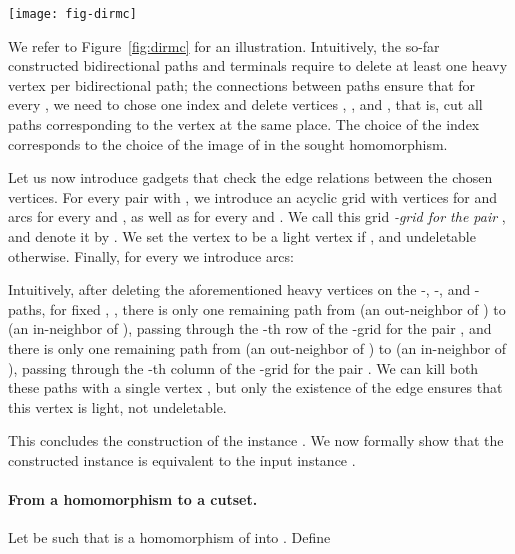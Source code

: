 \begin{figure*}[tb]
\begin{center}
\texttt{[image: fig-dirmc]}
\caption{Illustration of the reduction for \dirmc{}. Black vertices are light, gray are heavy, and white are undeletable.
The top figure illustates a -grid, together with an intended solution marked by red circles.
Here, the vertex  lies in the top-left corner of the grid, the first coordinate describes the row of the grid,
and the second one the column.
The bottom figure illustrates an -, -, and -path for a pair  with  and .}
\label{fig:dirmc}
\end{center}
\end{figure*}

We refer to Figure~\ref{fig:dirmc} for an illustration.
Intuitively, the so-far constructed bidirectional paths and terminals require to delete at least one heavy vertex per 
bidirectional path; the connections between paths ensure that for every , we need to chose
one index  and delete vertices , , and , that is, cut all paths corresponding to the vertex  at the same place. The choice of the index  corresponds
to the choice of the image of  in the sought homomorphism.

Let us now introduce gadgets that check the edge relations between the chosen vertices.
For every pair  with ,  we introduce an acyclic  grid with vertices  for 
and arcs  for every  and , as well as 
 for every  and .
We call this grid \emph{-grid for the pair }, and denote it by .
We set the vertex  to be a light vertex if , and undeletable otherwise.
Finally, for every  we introduce arcs:

Intuitively, after deleting the aforementioned heavy vertices on the -, -, and -paths, for fixed , ,
there is only one remaining path from  (an out-neighbor of ) to  (an in-neighbor of ),
passing through the -th row of the -grid for the pair ,
and there is only one remaining path from  (an out-neighbor of ) to  (an in-neighbor of ),
passing through the -th column of the -grid for the pair .
We can kill both these paths with a single vertex , but only
the existence of the edge  ensures that this vertex is light, not undeletable.

This concludes the construction of the instance .
We now formally show that the constructed instance is equivalent to the input
\subiso{} instance .

\paragraph{From a homomorphism to a cutset.}
Let  be such that 
is a homomorphism of  into .
Define

